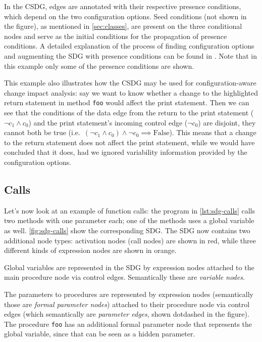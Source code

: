 In the CSDG, edges are annotated with their respective presence conditions, which depend on the two configuration 
options. Seed conditions (not shown in the figure), as mentioned in \autoref{sec:classes}, are present on the three 
conditional nodes and serve as the initial conditions for the propagation of presence conditions. A detailed 
explanation of the process of finding configuration options and augmenting the SDG with presence conditions can be 
found in \cite{DBLP:conf/kbse/AngererGPG15}. Note that in this example only some of the presence conditions are shown.

This example also illustrates how the CSDG may be used for configuration-aware change impact analysis: say we want to 
know whether a change to the highlighted return statement in method \lstinline|foo| would affect the print statement. 
Then we can see that the conditions of the data edge from the return to the print statement ($ \lnot c_1 \land c_0 $) 
and the print statement's incoming control edge ($ \lnot c_0 $) are disjoint, they cannot both be true
(i.e.\ $ \left( \lnot c_1 \land c_0 \right) \land \lnot c_0 \implies \text{False} $). This means that a change to the 
return statement does not affect the print statement, while we would have concluded that it does, had we ignored 
variability information provided by the configuration options.



\subsection{Calls}

Let's now look at an example of function calls: the program in \autoref{lst:sdg-calls} calls two methods with one 
parameter each; one of the methods uses a global variable as well. \autoref{fig:sdg-calls} show the corresponding SDG. 
The SDG now contains two additional node types: activation nodes (call nodes) are shown in red, while three different 
kinds of expression nodes are shown in orange.

Global variables are represented in the SDG by expression nodes attached to the main procedure node via control edges. 
Semantically these are \emph{variable nodes}.

The parameters to procedures are represented by expression nodes (semantically those are \emph{formal parameter nodes}) 
attached to their procedure node via control edges (which semantically are \emph{parameter edges}, shown dotdashed in 
the figure). The procedure \lstinline|foo| has an additional formal parameter node that represents the global variable, 
since that can be seen as a hidden parameter.


